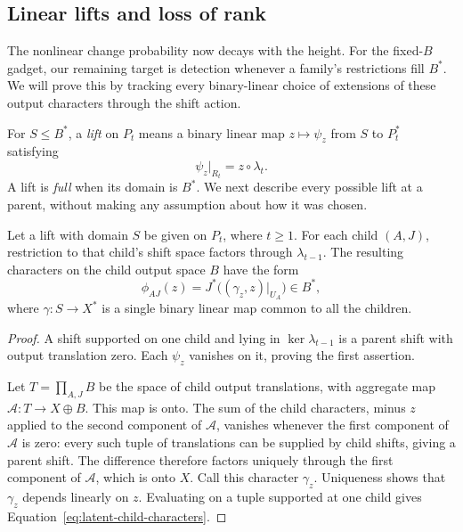\subsection{Linear lifts and loss of rank}

The nonlinear change probability now decays with the height.  For the
fixed-$B$ gadget, our remaining target is detection whenever a family's
restrictions fill $B^*$.  We will prove this by tracking every binary-linear
choice of extensions of these output characters through the shift action.

For $S\le B^*$, a \emph{lift} on $P_t$ means a binary linear map
$z\mapsto\psi_z$ from $S$ to $P_t^*$ satisfying
\begin{equation}\label{eq:latent-lift-definition}
 \psi_z|_{R_t}=z\circ\lambda_t.
\end{equation}
A lift is \emph{full} when its domain is $B^*$.  We next describe every
possible lift at a parent, without making any assumption about how it was
chosen.

\begin{lemma}\label{lem:latent-lift-factorization}
Let a lift with domain $S$ be given on $P_t$, where $t\ge1$.
For each child $(A,J)$, restriction to that child's shift space factors
through $\lambda_{t-1}$.  The resulting characters on the child output
space $B$ have the form
\begin{equation}\label{eq:latent-child-characters}
 \phi_{AJ}(z)=J^*\bigl((\gamma_z,z)|_{U_A}\bigr)\in B^*,
\end{equation}
where $\gamma:S\to X^*$ is a single binary linear map common to all the
children.
\end{lemma}

\begin{proof}
A shift supported on one child and lying in $\ker\lambda_{t-1}$ is a
parent shift with output translation zero.  Each $\psi_z$ vanishes on it,
proving the first assertion.

Let $T=\prod_{A,J}B$ be the space of child output translations, with aggregate
map $\mathcal A:T\to X\oplus B$.  This map is onto.  The sum of the
child characters, minus $z$ applied to the second component of
$\mathcal A$, vanishes whenever the first component of $\mathcal A$ is
zero: every such tuple of translations can be supplied by child shifts,
giving a parent shift.  The difference therefore factors uniquely through the
first component of $\mathcal A$, which is onto $X$.  Call this character
$\gamma_z$.  Uniqueness shows that $\gamma_z$ depends linearly on $z$.
Evaluating on a tuple supported at one child gives
Equation~\eqref{eq:latent-child-characters}.
\end{proof}

